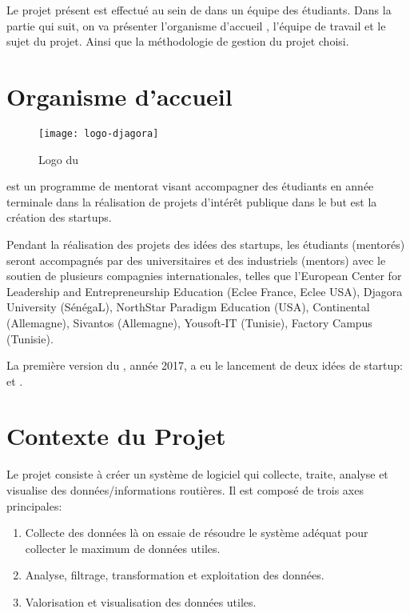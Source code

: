 
Le projet présent est effectué au sein de  dans un
équipe des étudiants. Dans la partie qui suit, on va présenter l'organisme
d'accueil , l'équipe de travail et le sujet du
projet. Ainsi que la méthodologie de gestion du projet choisi.


\section{Organisme d'accueil }

\begin{figure}[!h]
    \centering
    \texttt{[image: logo-djagora]}
    \caption{Logo du }
    \label{fig:logo-djagora}
\end{figure}

 est un programme de mentorat visant accompagner des
étudiants en année terminale dans la réalisation de projets d'intérêt publique
dans le but est la création des startups.

Pendant la réalisation des projets des idées des startups, les étudiants
(mentorés) seront accompagnés par des universitaires et des industriels
(mentors) avec le soutien de plusieurs compagnies internationales, telles que
l'European Center for Leadership and Entrepreneurship Education (Eclee France,
Eclee USA), Djagora University (SénégaL), NorthStar Paradigm Education (USA),
Continental (Allemagne), Sivantos (Allemagne), Yousoft-IT (Tunisie), Factory
Campus (Tunisie).

La première version du , année 2017, a eu le
lancement de deux idées de startup:  et .

\section{Contexte du Projet}

Le projet  consiste à créer un système de logiciel qui
collecte, traite, analyse et visualise des données/informations routières. Il
est composé de trois axes principales:

\begin{enumerate}
    \item Collecte des données là on essaie de résoudre le système adéquat pour
        collecter le maximum de données utiles.
    \item Analyse, filtrage, transformation et exploitation des données.
    \item Valorisation et visualisation des données utiles.
\end{enumerate}


